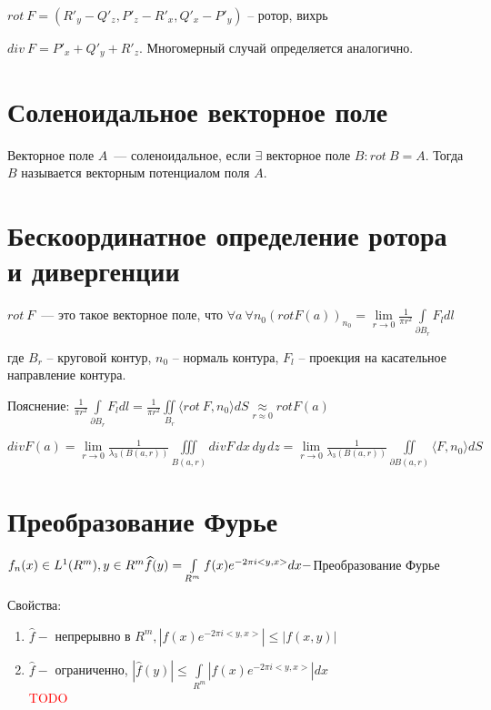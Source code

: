 \documentclass[paper=a4, fontsize=14pt]{report}
\begin{document}
	$ rot\ F = (R'_y - Q'_z, P'_z - R'_x, Q'_x - P'_y) $ -- ротор, вихрь

	$div\ F = P'_x + Q'_y + R'_z$. Многомерный случай определяется аналогично.

	\section{Соленоидальное векторное поле}
	Векторное поле $A$~--- соленоидальное, если $\exists$ векторное поле $B: rot\ B = A$. Тогда $B$ называется векторным потенциалом поля $A$.

	\section{Бескоординатное определение ротора и дивергенции}
	$rot\ F$~--- это такое векторное поле, что $\forall a \ \forall n_0 (rot F(a))_{n_0} = \lim\limits_{r\to 0} \frac{1}{\pi r^2} \int\limits_{\partial B_r} F_ldl$
		
	где $ B_r $ -- круговой контур, $ n_0 $ -- нормаль контура, $ F_l $ -- проекция на касательное направление контура. 

	Пояснение: $ \frac{1}{\pi r^2} \int\limits_{\partial B_r} F_ldl =  \frac{1}{\pi r^2} \iint\limits_{B_r} \langle rot\ F, n_0 \rangle dS \underset{r \approx 0}{\approx} rot F(a)$
	


	$div F(a) = \lim\limits_{r\to 0} \frac{1}{\lambda_3(B(a,r))} \iiint\limits_{B(a,r)} div F \,dx\,dy\,dz = \lim\limits_{r\to 0} \frac{1}{\lambda_3(B(a,r))} \iint\limits_{\partial B(a,r)} \langle F, n_0 \rangle dS$
	
	\section{Преобразование Фурье}
	
	$f_n(x) \in L^1(R^m), y \in R^m \\ \widehat{f}(y) = \int\limits_{R^m} f(x)e^{-2\pi i <y,x>}dx - $Преобразование Фурье
	
	Свойства:\begin{enumerate} 
		\item $\widehat{f} -$ непрерывно в $R^m, |f(x)e^{-2\pi i <y,x>}| \leq |f(x,y)|$
		\item $\widehat{f} -$ ограниченно, $|\widehat{f}(y)| \leq \int\limits_{R^m} |f(x)e^{-2\pi i <y,x>}|dx$
		\\ \textcolor{red}{TODO}
	\end{enumerate}
	
\end{document}
